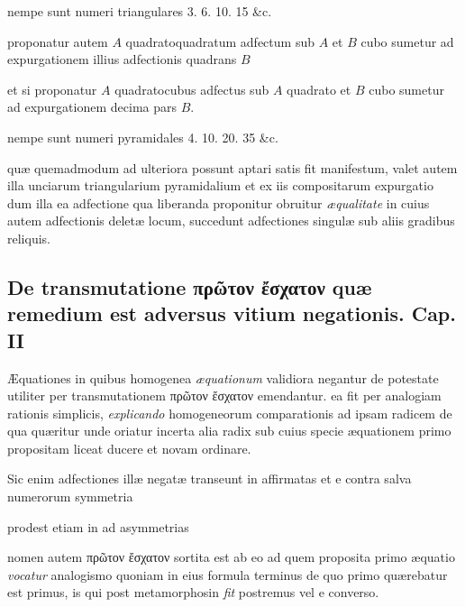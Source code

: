 \documentclass[11pt,a4paper]{article}
\begin{document}
nempe sunt numeri triangulares 3. 6. 10. 15 \&c.

proponatur autem $A$ quadratoquadratum adfectum sub $A$ et $B$ cubo sumetur ad expurgationem illius adfectionis quadrans $B$

et si proponatur $A$ quadratocubus adfectus sub $A$ quadrato et $B$ cubo sumetur ad expurgationem decima pars $B$.

nempe sunt numeri pyramidales 4. 10. 20. 35 \&c.

quæ quemadmodum ad ulteriora possunt aptari satis fit manifestum, valet autem illa unciarum triangularium pyramidalium et ex iis compositarum expurgatio dum illa ea adfectione qua liberanda proponitur obruitur \emph{æqualitate} in cuius autem adfectionis deletæ locum, succedunt adfectiones singulæ sub aliis gradibus reliquis.

\subsection*{De transmutatione πρῶτον ἔσχατον quæ remedium est adversus vitium negationis. Cap. II}

Æquationes in quibus homogenea \emph{æquationum} validiora negantur de potestate utiliter per transmutationem πρῶτον ἔσχατον emendantur. ea fit per analogiam rationis simplicis, \emph{explicando} homogeneorum comparationis ad ipsam radicem de qua quæritur unde oriatur incerta alia radix sub cuius specie æquationem primo propositam liceat ducere et novam ordinare.

Sic enim adfectiones illæ negatæ transeunt in affirmatas et e contra salva numerorum symmetria

prodest etiam in  ad asymmetrias

nomen autem πρῶτον ἔσχατον sortita est ab eo ad quem proposita primo æquatio \emph{vocatur} analogismo quoniam in eius formula terminus de quo primo quærebatur est primus, is qui post metamorphosin \emph{fit} postremus vel e converso.
\end{document}
